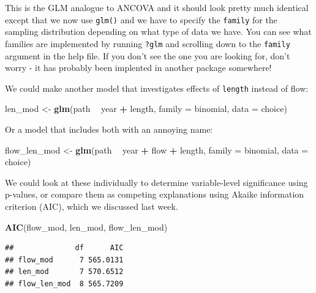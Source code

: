 \documentclass[
]{book}
\newenvironment{Shaded}{\begin{snugshade}}{\end{snugshade}}
\newcommand{\DataTypeTok}[1]{\textcolor[rgb]{0.13,0.29,0.53}{#1}}
\newcommand{\KeywordTok}[1]{\textcolor[rgb]{0.13,0.29,0.53}{\textbf{#1}}}
\newcommand{\NormalTok}[1]{#1}
\newcommand{\OperatorTok}[1]{\textcolor[rgb]{0.81,0.36,0.00}{\textbf{#1}}}
\newcommand{\StringTok}[1]{\textcolor[rgb]{0.31,0.60,0.02}{#1}}
\begin{document}
This is the GLM analogue to ANCOVA and it should look pretty much identical except that we now use \texttt{glm()} and we have to specify the \texttt{family} for the sampling distribution depending on what type of data we have. You can see what families are implemented by running \texttt{?glm} and scrolling down to the \texttt{family} argument in the help file. If you don't see the one you are looking for, don't worry - it has probably been implented in another package somewhere!

We could make another model that investigates effects of \texttt{length} instead of flow:

\begin{Shaded}
\begin{Highlighting}[]
\NormalTok{len_mod <-}\StringTok{ }\KeywordTok{glm}\NormalTok{(path }\OperatorTok{~}\StringTok{ }\NormalTok{year }\OperatorTok{+}\StringTok{ }\NormalTok{length, }\DataTypeTok{family =}\NormalTok{ binomial, }\DataTypeTok{data =}\NormalTok{ choice)}
\end{Highlighting}
\end{Shaded}

Or a model that includes both with an annoying name:

\begin{Shaded}
\begin{Highlighting}[]
\NormalTok{flow_len_mod <-}\StringTok{ }\KeywordTok{glm}\NormalTok{(path }\OperatorTok{~}\StringTok{ }\NormalTok{year }\OperatorTok{+}\StringTok{ }\NormalTok{flow }\OperatorTok{+}\StringTok{ }\NormalTok{length, }\DataTypeTok{family =}\NormalTok{ binomial, }\DataTypeTok{data =}\NormalTok{ choice)}
\end{Highlighting}
\end{Shaded}

We could look at these individually to determine variable-level significance using p-values, or compare them as competing explanations using Akaike information criterion (AIC), which we discussed last week.

\begin{Shaded}
\begin{Highlighting}[]
\KeywordTok{AIC}\NormalTok{(flow_mod, len_mod, flow_len_mod)}
\end{Highlighting}
\end{Shaded}

\begin{verbatim}
##              df      AIC
## flow_mod      7 565.0131
## len_mod       7 570.6512
## flow_len_mod  8 565.7209
\end{verbatim}
\end{document}

